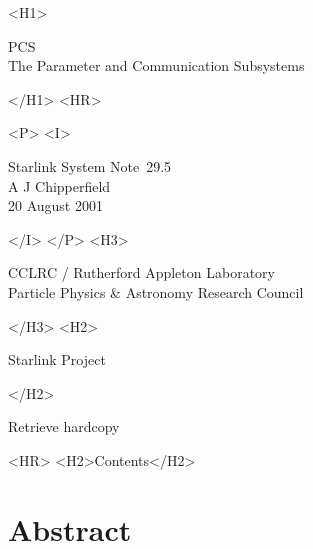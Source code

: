 \documentclass[twoside,11pt]{article}
\newcommand{\stardoccategory}  {Starlink System Note}
\newcommand{\stardocsource}    {ssn\stardocnumber}
\newcommand{\stardocnumber}    {29.5}
\newcommand{\stardocauthors}   {A J Chipperfield}
\newcommand{\stardocdate}      {20 August 2001}
\newcommand{\stardoctitle}     {PCS\\[1ex]
                                The Parameter and Communication Subsystems}
\newcommand{\htmladdnormallink}[2]{#1}
\newcommand{\htmladdimg}[1]{}
\newcommand{\htmlref}[2]{#1}
\newcommand{\htmladdtonavigation}[1]{}
\newcommand{\xlabel}[1]{}
\renewcommand{\_}{\texttt{\symbol{95}}}
\begin{document}
\begin{htmlonly}
   \xlabel{}
   \begin{rawhtml} <H1> \end{rawhtml}
      \stardoctitle
   \begin{rawhtml} </H1> <HR> \end{rawhtml}

   \begin{rawhtml} <P> <I> \end{rawhtml}
   \stardoccategory\ \stardocnumber \\
   \stardocauthors \\
   \stardocdate
   \begin{rawhtml} </I> </P> <H3> \end{rawhtml}
      \htmladdnormallink{CCLRC / Rutherford Appleton Laboratory}
                        {http://www.cclrc.ac.uk} \\
      \htmladdnormallink{Particle Physics \& Astronomy Research Council}
                        {http://www.pparc.ac.uk} \\
   \begin{rawhtml} </H3> <H2> \end{rawhtml}
      \htmladdnormallink{Starlink Project}{http://www.starlink.ac.uk/}
   \begin{rawhtml} </H2> \end{rawhtml}
   \htmladdnormallink{\htmladdimg{source.gif} Retrieve hardcopy}
      {http://www.starlink.ac.uk/cgi-bin/hcserver?\stardocsource}\\

  \label{stardoccontents}
  \begin{rawhtml}
    <HR>
    <H2>Contents</H2>
  \end{rawhtml}
  \htmladdtonavigation{\htmlref{\htmladdimg{contents_motif.gif}}
        {stardoccontents}}

  \section{\xlabel{abstract}Abstract}

\end{htmlonly}
\end{document}
